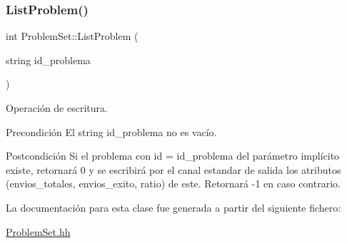 \subsubsection{\texorpdfstring{List\+Problem()}{ListProblem()}}
{\footnotesize\ttfamily int Problem\+Set\+::\+List\+Problem (\begin{DoxyParamCaption}\item[{string}]{id\+\_\+problema }\end{DoxyParamCaption})}



Operación de escritura. 

\begin{DoxyPrecond}{Precondición}
El string id\+\_\+problema no es vacío. 
\end{DoxyPrecond}
\begin{DoxyPostcond}{Postcondición}
Si el problema con id = id\+\_\+problema del parámetro implícito existe, retornará 0 y se escribirá por el canal estandar de salida los atributos (envios\+\_\+totales, envios\+\_\+exito, ratio) de este. Retornará -\/1 en caso contrario. 
\end{DoxyPostcond}


La documentación para esta clase fue generada a partir del siguiente fichero\+:\begin{DoxyCompactItemize}
\item 
\mbox{\hyperlink{_problem_set_8hh}{Problem\+Set.\+hh}}\end{DoxyCompactItemize}
